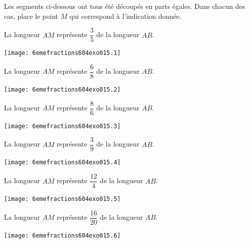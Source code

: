 Les segments ci-dessous ont tous été découpés en parts égales. Dans chacun des cas, place le point $M$ qui correspond à l'indication donnée.
\begin{myenumerate}
  \item {\begin{cursive}La longueur $AM$ représente $\dfrac35$ de la longueur $AB$.\end{cursive}}
\texttt{[image: 6emefractions604exo015.1]}
  \item {\begin{cursive}La longueur $AM$ représente $\dfrac68$ de la longueur $AB$.\end{cursive}}
\texttt{[image: 6emefractions604exo015.2]}
  \item {\begin{cursive}La longueur $AM$ représente $\dfrac86$ de la longueur $AB$.\end{cursive}}
\texttt{[image: 6emefractions604exo015.3]}
  \item {\begin{cursive}La longueur $AM$ représente $\dfrac39$ de la longueur $AB$.\end{cursive}}
\texttt{[image: 6emefractions604exo015.4]}
  \item {\begin{cursive}La longueur $AM$ représente $\dfrac{12}4$ de la longueur $AB$.\end{cursive}}
\texttt{[image: 6emefractions604exo015.5]}
  \item {\begin{cursive}La longueur $AM$ représente $\dfrac{16}{20}$ de la longueur $AB$.\end{cursive}}
\texttt{[image: 6emefractions604exo015.6]}
\end{myenumerate}